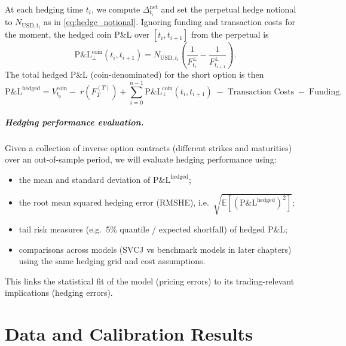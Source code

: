 \documentclass[a4paper,titlepage,12pt]{report}
\theoremstyle{plain}
\begin{document}
At each hedging time $t_i$, we compute $\Delta_{t_i}^{\mathrm{net}}$ and set the perpetual hedge notional to $N_{\mathrm{USD},t_i}$ as in \eqref{eq:hedge_notional}. Ignoring funding and transaction costs for the moment, the hedged coin P\&L over $[t_i,t_{i+1}]$ from the perpetual is
\begin{equation}
\mathrm{P\&L}^{\mathrm{coin}}_{\perp}(t_i,t_{i+1})
=
N_{\mathrm{USD},t_i}
\left(
\frac{1}{F_{t_i}^{\perp}}-\frac{1}{F_{t_{i+1}}^{\perp}}
\right).
\end{equation}
The total hedged P\&L (coin-denominated) for the short option is then
\begin{equation}
\boxed{
\mathrm{P\&L}^{\mathrm{hedged}}
=
V_{t_0}^{\mathrm{coin}}
-\; r(F_T^{(T)})
+\sum_{i=0}^{n-1}\mathrm{P\&L}^{\mathrm{coin}}_{\perp}(t_i,t_{i+1})
\;-\;\text{Transaction Costs}
\;-\;\text{Funding}.}
\label{eq:hedged_pnl_definition}
\end{equation}

\paragraph{Hedging performance evaluation.}
Given a collection of inverse option contracts (different strikes and maturities) over an out-of-sample period, we will evaluate hedging performance using:
\begin{itemize}[leftmargin=2em]
\item the mean and standard deviation of $\mathrm{P\&L}^{\mathrm{hedged}}$;
\item the root mean squared hedging error (RMSHE), i.e.\ $\sqrt{\mathbb{E}[(\mathrm{P\&L}^{\mathrm{hedged}})^2]}$;
\item tail risk measures (e.g.\ 5\% quantile / expected shortfall) of hedged P\&L;
\item comparisons across models (SVCJ vs benchmark models in later chapters) using the same hedging grid and cost assumptions.
\end{itemize}
This links the statistical fit of the model (pricing errors) to its trading-relevant implications (hedging errors).




\chapter{Data and Calibration Results}\label{ch:data_calibration}
\end{document}
